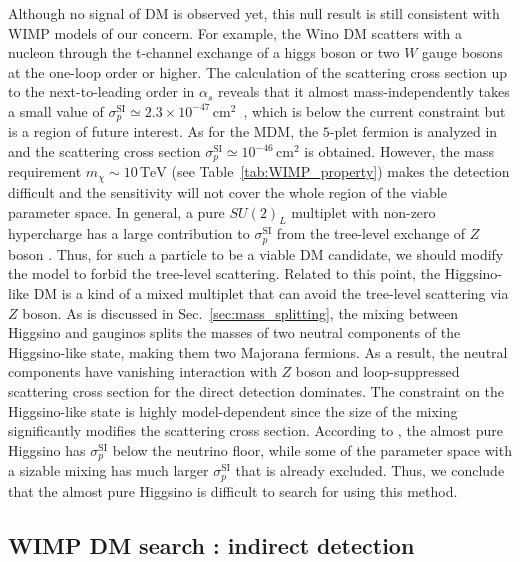 \documentclass[12pt,twoside,book]{article}
\begin{document}
Although no signal of DM is observed yet, this null result is still consistent with WIMP models of our concern.
For example, the Wino DM scatters with a nucleon through the t-channel exchange of a higgs boson or two $W$ gauge bosons at the one-loop order or higher.
The calculation of the scattering cross section up to the next-to-leading order in $\alpha_s$ reveals that it almost mass-independently takes a small value of $\sigma_p^{\mathrm{SI}} \simeq 2.3 \times 10^{-47}\,\mathrm{cm}^2$~\cite{Hisano:2015rsa}, which is below the current constraint but is a region of future interest.
As for the MDM, the $5$-plet fermion is analyzed in \cite{Hisano:2011cs} and the scattering cross section $\sigma_p^{\mathrm{SI}} \simeq 10^{-46}\,\mathrm{cm}^2$ is obtained.
However, the mass requirement $m_\chi \sim 10\,\mathrm{TeV}$ (see Table~\ref{tab:WIMP_property}) makes the detection difficult and the sensitivity will not cover the whole region of the viable parameter space.
In general, a pure $SU(2)_L$ multiplet with non-zero hypercharge has a large contribution to $\sigma_p^{\mathrm{SI}}$ from the tree-level exchange of $Z$ boson \cite{Farina:2013mla}.
Thus, for such a particle to be a viable DM candidate, we should modify the model to forbid the tree-level scattering.
Related to this point, the Higgsino-like DM is a kind of a mixed multiplet that can avoid the tree-level scattering via $Z$ boson.
As is discussed in Sec.~\ref{sec:mass_splitting}, the mixing between Higgsino and gauginos splits the masses of two neutral components of the Higgsino-like state, making them two Majorana fermions.
As a result, the neutral components have vanishing interaction with $Z$ boson and loop-suppressed scattering cross section for the direct detection dominates.
The constraint on the Higgsino-like state is highly model-dependent since the size of the mixing significantly modifies the scattering cross section.
According to \cite{Hisano:2012wm, Roszkowski:2014wqa}, the almost pure Higgsino has $\sigma_p^{\mathrm{SI}}$ below the neutrino floor, while some of the parameter space with a sizable mixing has much larger $\sigma_p^{\mathrm{SI}}$ that is already excluded.
Thus, we conclude that the almost pure Higgsino is difficult to search for using this method.


\subsection{WIMP DM search : indirect detection}
\label{sec:indirect_detection}
\end{document}
